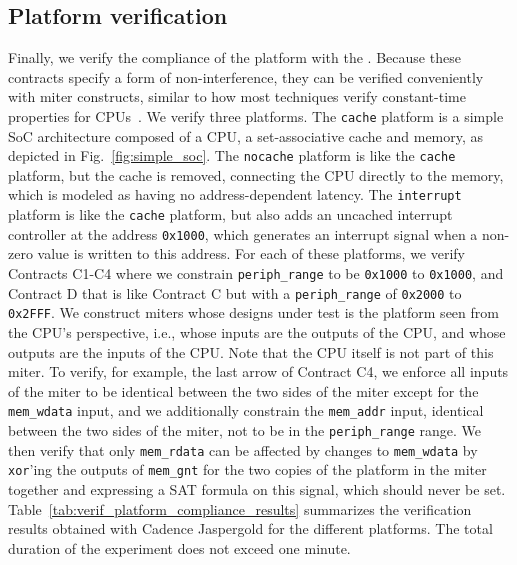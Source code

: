 \subsection{Platform verification}
\label{subsec:pici_platform_verif}

Finally, we verify the compliance of the platform with the \pic.
Because these contracts specify a form of non-interference, they can be verified conveniently with miter constructs, similar to how most techniques verify constant-time properties for CPUs~\cite{dinesh2024conjunct,dinesh2025h,wang2023specification,tan2025contractshadowlogic}.
We verify three platforms.
The \texttt{cache} platform is a simple SoC architecture composed of a CPU, a set-associative cache and memory, as depicted in Fig.~\ref{fig:simple_soc}.
The \texttt{nocache} platform is like the \texttt{cache} platform, but the cache is removed, connecting the CPU directly to the memory, which is modeled as having no address-dependent latency.
The \texttt{interrupt} platform is like the \texttt{cache} platform, but also adds an uncached interrupt controller at the address \texttt{0x1000}, which generates an interrupt signal when a non-zero value is written to this address.
For each of these platforms, we verify Contracts C1-C4 where we constrain \texttt{periph\_range} to be \texttt{0x1000} to \texttt{0x1000}, and Contract D that is like Contract C but with a \texttt{periph\_range} of \texttt{0x2000} to \texttt{0x2FFF}.
We construct miters whose designs under test is the platform seen from the CPU's perspective, i.e., whose inputs are the outputs of the CPU, and whose outputs are the inputs of the CPU.
Note that the CPU itself is not part of this miter.
To verify, for example, the last arrow of Contract C4, we enforce all inputs of the miter to be identical between the two sides of the miter except for the \texttt{mem\_wdata} input, and we additionally constrain the \texttt{mem\_addr} input, identical between the two sides of the miter, not to be in the \texttt{periph\_range} range.
We then verify that only \texttt{mem\_rdata} can be affected by changes to \texttt{mem\_wdata} by \texttt{xor}'ing the outputs of \texttt{mem\_gnt} for the two copies of the platform in the miter together and expressing a SAT formula on this signal, which should never be set.
Table~\ref{tab:verif_platform_compliance_results} summarizes the verification results obtained with Cadence Jaspergold for the different platforms.
The total duration of the experiment does not exceed one minute.
